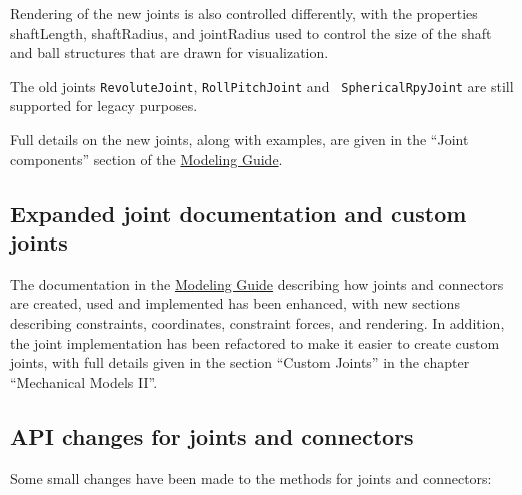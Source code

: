 \documentclass{article}
\begin{document}
Rendering of the new joints is also controlled differently, with
the properties {\sf shaftLength}, {\sf shaftRadius}, and {\sf jointRadius}
used to control the size of the shaft and ball structures that are
drawn for visualization.

The old joints {\tt RevoluteJoint}, {\tt RollPitchJoint} and {\tt
SphericalRpyJoint} are still supported for legacy purposes.

Full details on the new joints, along with examples, are given in the
``Joint components'' section of the
\href{http://www.artisynth.org/doc/pdf/modelguide.pdf}
{Modeling Guide}.

\subsection*{Expanded joint documentation and custom joints}

The documentation in the
\href{http://www.artisynth.org/doc/pdf/modelguide.pdf} {Modeling
Guide} describing how joints and connectors are created, used and
implemented has been enhanced, with new sections describing
constraints, coordinates, constraint forces, and rendering.  In
addition, the joint implementation has been refactored to make it
easier to create custom joints, with full details given in the section
``Custom Joints'' in the chapter ``Mechanical Models II''.

\subsection*{API changes for joints and connectors}

Some small changes have been made to the methods for joints and
connectors:
\end{document}
